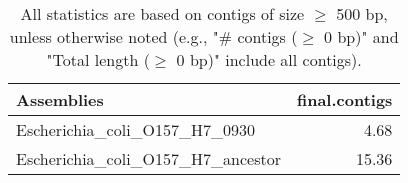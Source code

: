 \documentclass[12pt,a4paper]{article}
\begin{document}
\begin{table}[ht]
\begin{center}
\caption{All statistics are based on contigs of size $\geq$ 500 bp, unless otherwise noted (e.g., "\# contigs ($\geq$ 0 bp)" and "Total length ($\geq$ 0 bp)" include all contigs).}
\begin{tabular}{|l*{1}{|r}|}
\hline
Assemblies & final.contigs \\ \hline
Escherichia\_coli\_O157\_H7\_0930 & 4.68 \\ \hline
Escherichia\_coli\_O157\_H7\_ancestor & 15.36 \\ \hline
\end{tabular}
\end{center}
\end{table}
\end{document}
